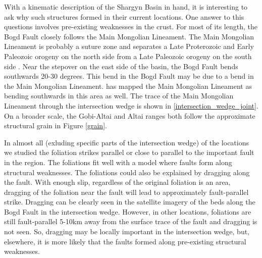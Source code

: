         With a kinematic description of the Shargyn Basin in hand, it is interesting to ask why such structures formed in their current locations. One answer to this questions involves pre-existing weaknesses in the crust. For most of its length, the Bogd Fault closely follows the Main Mongolian Lineament. The Main Mongolian Lineament is probably a suture zone and separates a Late Proterozoic and Early Paleozoic orogeny on the north side from a Late Paleozoic orogeny on the south side \citep{Windley2007}. Near the stepover on the east side of the basin, the Bogd Fault bends southwards 20-30 degrees. This bend in the Bogd Fault may be due to a bend in the Main Mongolian Lineament. \citet{Windley2007} has mapped the Main Mongolian Lineament as bending southwards in this area as well. The trace of the Main Mongolian Lineament through the intersection wedge is shown in \ref{intersection_wedge_joint}. On a broader scale, the Gobi-Altai and Altai ranges both follow the approximate structural grain in Figure \ref{grain}.
	
	In almost all (exluding specific parts of the intersection wedge) of the locations we studied the foliation strikes parallel or close to parallel to the important fault in the region. The foliations fit well with a model where faults form along structural weaknesses. The foliations could also be explained by dragging along the fault. With enough slip, regardless of the original foliation is an area, dragging of the foliation near the fault will lead to approximately fault-parallel strike. Dragging can be clearly seen in the satellite imagery of the beds along the Bogd Fault in the intersection wedge. However, in other locations, foliations are still fault-parallel 5-10km away from the surface trace of the fault and dragging is not seen. So, dragging may be locally important in the intersection wedge, but, elsewhere, it is more likely that the faults formed along pre-existing structural weaknesses. 
